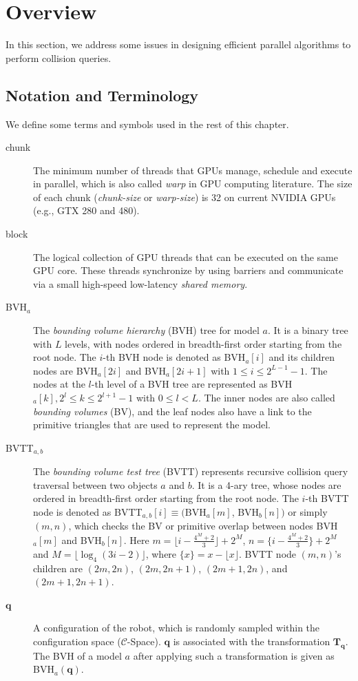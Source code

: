 \section{Overview}
\label{sec:5:overview}
In this section, we address
some issues in designing efficient parallel algorithms to perform collision queries.

\subsection{Notation and Terminology}
We define some terms and symbols used in the rest of this chapter.
\begin{description}
\item[chunk] The minimum number of threads that GPUs manage, schedule and execute in parallel, which is also called \emph{warp} in GPU computing literature. The size of each chunk (\emph{chunk-size} or \emph{warp-size}) is 32 on current NVIDIA GPUs (e.g., GTX 280 and 480).
\item[block] The logical collection of GPU threads that can be executed on the same GPU core. These threads synchronize by using barriers
and communicate via a small high-speed low-latency \emph{shared memory}.
\item[BVH$_a$] The \emph{bounding volume hierarchy} (BVH) tree for model $a$. It is a binary tree with $L$ levels, with nodes ordered in breadth-first order starting from the root node. The $i$-th BVH node is denoted as BVH$_a[i]$ and its children nodes are
BVH$_a[2i]$ and BVH$_a[2i+1]$ with $1\leq i \leq 2^{L-1}-1$. The nodes at the $l$-th level of a BVH tree are represented as
BVH$_a[k], 2^l \leq k \leq 2^{l+1} - 1$ with $0
\leq l < L$. The inner nodes are also called \emph{bounding volumes} (BV), and the leaf nodes also have a link to the primitive
triangles that are used to represent the model.
\item[BVTT$_{a,b}$] The \emph{bounding volume test tree} (BVTT) represents recursive collision query traversal between two
objects $a$ and $b$. It is a 4-ary tree, whose nodes are ordered in breadth-first order starting from the root node. The $i$-th BVTT node is denoted as BVTT$_
{a,b}[i]\equiv ($BVH$_a[m]$, BVH$_b[n])$ or simply $(m, n)$, which checks the BV or primitive overlap between nodes BVH$_a[m]$ and BVH$_b[n]$. Here $m = \lfloor i - \frac{4^M + 2}{3} \rfloor + 2^M$, $n = \{i - \frac{4^M + 2}{3}\} + 2^M$ and $M = \lfloor \log_4(3i -
2) \rfloor$, where $\{x\} = x - \lfloor x \rfloor$. BVTT node $(m, n)$'s children are $(2m, 2n)$, $(2m, 2n+1)$, $(2m+1,2n)$, and $(2m+1,2n+1)$.
\item[$\mathbf{q}$] A configuration of the robot, which is randomly sampled within the
configuration space ($\mathcal{C}$-Space).  $\mathbf{q}$ is associated with the transformation $\mathbf{T}_{\mathbf{q}}$.
The BVH of a model $a$ after applying such a transformation is given as BVH$_a(\mathbf{q})$.
\end{description}

